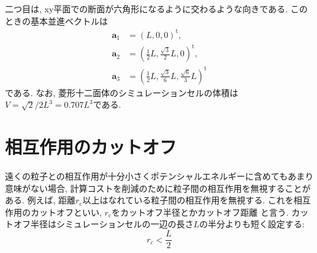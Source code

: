 二つ目は, xy平面での断面が六角形になるように交わるような向きである.
このときの基本並進ベクトルは
\begin{align}
  \bm{a}_{1} &= \left(           L,                    0,  0\right)^{\mathrm{t}}, \\
  \bm{a}_{2} &= \left(\frac{1}{2}L, \frac{\sqrt{3}}{2}L,   0\right)^{\mathrm{t}}, \\
  \bm{a}_{3} &= \left(\frac{1}{2}L, \frac{\sqrt{3}}{6}L,\frac{\sqrt{6}}{3}L \right)^\mathrm{t}
\end{align}
である.
なお, 菱形十二面体のシミュレーションセルの体積は$V = \sqrt{2}/2L^{3} = 0.707 L^{3}$である.

\section{相互作用のカットオフ}
遠くの粒子との相互作用が十分小さくポテンシャルエネルギーに含めてもあまり意味がない場合,
計算コストを削減のために粒子間の相互作用を無視することがある.
例えば, 距離$r_{\mathrm{c}}$以上はなれている粒子間の相互作用を無視する.
これを相互作用のカットオフといい, $r_{\mathrm{c}}$をカットオフ半径とかカットオフ距離
と言う. カットオフ半径はシミュレーションセルの一辺の長さ$L$の半分よりも短く設定する:
\begin{equation}
 r_{c} < \frac{L}{2}
\end{equation}

